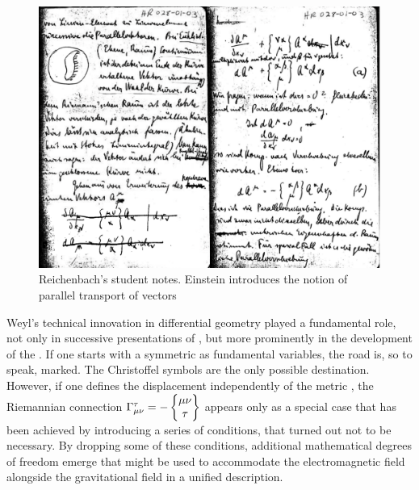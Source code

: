 \documentclass[final]{article}
\begin{document}

\begin{figure}
\begin{center}
 \includegraphics[scale=0.12, trim = 0mm 0mm 0mm 0mm, clip]{parallelverschiebungDOUB.png}
\caption{Reichenbach's student notes. Einstein introduces the notion of parallel transport of vectors}
\label{fig:parallel}
\end{center}
\end{figure}

Weyl's technical innovation in differential geometry played a fundamental role, not only in successive presentations of \gr \citep[see][45ff.]{Einstein1922}, but more prominently in the development of the \uftp. If one starts with a symmetric \gmn as fundamental variables, the road is, so to speak, marked. The Christoffel symbols are the only possible destination. However, if one defines the displacement \Gtmn independently of the metric \gmn, the Riemannian connection $\Gamma^\tau_{\mu\nu} = - \begin{Bmatrix} \mu \nu \\ \tau \end{Bmatrix}$ appears only as a special case that has been achieved by introducing a series of conditions, that turned out not to be necessary. By dropping some of these conditions, additional mathematical degrees of freedom emerge that might be used to accommodate the electromagnetic field alongside the gravitational field in a unified  description.
\end{document}
